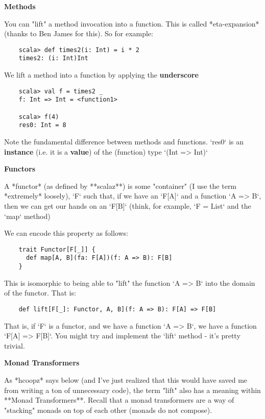 \documentclass{article}
\begin{document}
\textbf{Methods}

You can "lift" a method invocation into a function. This is called *eta-expansion* (thanks to Ben James for this). So for example:

\begin{verbatim}
    scala> def times2(i: Int) = i * 2
    times2: (i: Int)Int
\end{verbatim}

We lift a method into a function by applying the \textbf{underscore}

\begin{verbatim}
    scala> val f = times2 _
    f: Int => Int = <function1>

    scala> f(4)
    res0: Int = 8
\end{verbatim}

Note the fundamental difference between methods and functions. `res0` is an \textbf{instance} (i.e. it is a \textbf{value}) of the (function) type `(Int => Int)`

\textbf{Functors}

A *functor* (as defined by **scalaz**) is some "container" (I use the term *extremely* loosely), `F` such that, if we have an `F[A]` and a function `A => B`, then we can get our hands on an `F[B]` (think, for example, `F = List` and the `map` method)

We can encode this property as follows:

\begin{verbatim}
    trait Functor[F[_]] { 
      def map[A, B](fa: F[A])(f: A => B): F[B]
    }
\end{verbatim}

This is isomorphic to being able to "lift" the function `A => B` into the domain of the functor. That is:

\begin{verbatim}
    def lift[F[_]: Functor, A, B](f: A => B): F[A] => F[B]
\end{verbatim}

That is, if `F` is a functor, and we have a function `A => B`, we have a function `F[A] => F[B]`. You might try and implement the `lift` method - it's pretty trivial.

\textbf{Monad Transformers}

As *hcoopz* says below (and I've just realized that this would have saved me from writing a ton of unnecessary code), the term "lift" also has a meaning within **Monad Transformers**. Recall that a monad transformers are a way of "stacking" monads on top of each other (monads do not compose).
\end{document}
